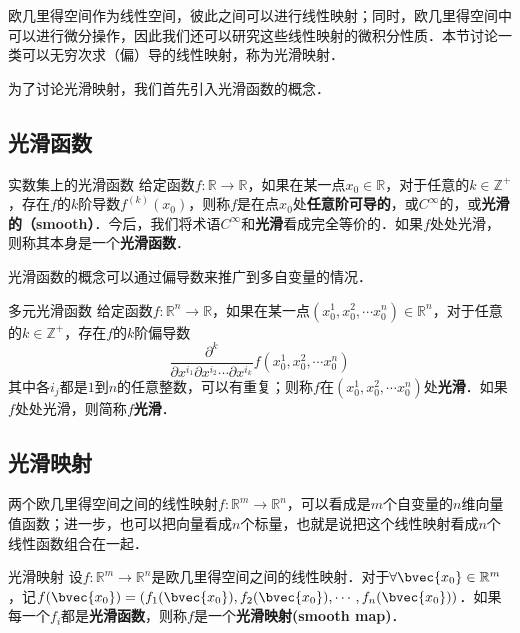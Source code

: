 
欧几里得空间作为线性空间，彼此之间可以进行线性映射；同时，欧几里得空间中可以进行微分操作，因此我们还可以研究这些线性映射的微积分性质．本节讨论一类可以无穷次求（偏）导的线性映射，称为光滑映射．

为了讨论光滑映射，我们首先引入光滑函数的概念．

\subsection{光滑函数}

\begin{definition}{实数集上的光滑函数}
给定函数$f:\mathbb{R}\rightarrow\mathbb{R}$，如果在某一点$x_0\in\mathbb{R}$，对于任意的$k\in\mathbb{Z}^+$，存在$f$的$k$阶导数$f^{(k)}(x_0)$，则称$f$是在点$x_0$处\textbf{任意阶可导的}，或$C^\infty$的，或\textbf{光滑的（smooth）}．今后，我们将术语$C^{\infty}$和\textbf{光滑}看成完全等价的．如果$f$处处光滑，则称其本身是一个\textbf{光滑函数}．
\end{definition}

光滑函数的概念可以通过偏导数来推广到多自变量的情况．

\begin{definition}{多元光滑函数}
给定函数$f:\mathbb{R}^n\rightarrow\mathbb{R}$，如果在某一点$(x_0^1, x_0^2, \cdots x_0^n) \in\mathbb{R}^n$，对于任意的$k\in\mathbb{Z}^+$，存在$f$的$k$阶偏导数$$\frac{\partial^k}{\partial x^{i_1}\partial x^{i_2}\cdots\partial x^{i_k}}f(x_0^1, x_0^2, \cdots x_0^n)$$其中各$i_j$都是$1$到$n$的任意整数，可以有重复；则称$f$在$(x_0^1, x_0^2, \cdots x_0^n)$处\textbf{光滑}．如果$f$处处光滑，则简称$f$\textbf{光滑}．
\end{definition}

\subsection{光滑映射}

两个欧几里得空间之间的线性映射$f:\mathbb{R}^m\rightarrow \mathbb{R}^n$，可以看成是$m$个自变量的$n$维向量值函数；进一步，也可以把向量看成$n$个标量，也就是说把这个线性映射看成$n$个线性函数组合在一起．

\begin{definition}{光滑映射}
设$f:\mathbb{R}^m\rightarrow \mathbb{R}^n$是欧几里得空间之间的线性映射．对于$\forall \bvec{x_0} \in \mathbb{R}^m$，记$f(\bvec{x_0})=(f_1(\bvec{x_0}), f_2(\bvec{x_0}),\cdots, f_n(\bvec{x_0}))$．如果每一个$f_i$都是\textbf{光滑函数}，则称$f$是一个\textbf{光滑映射(smooth map)}．
\end{definition}

